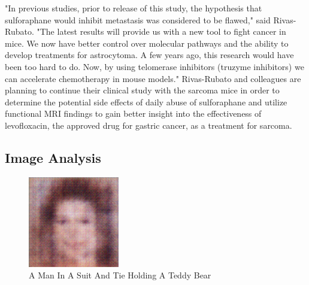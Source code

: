 \documentclass{article}%
\begin{document}
"In previous studies, prior to release of this study, the hypothesis that sulforaphane would inhibit metastasis was considered to be flawed," said Rivas{-}Rubato. "The latest results will provide us with a new tool to fight cancer in mice. We now have better control over molecular pathways and the ability to develop treatments for astrocytoma. A few years ago, this research would have been too hard to do. Now, by using telomerase inhibitors (truzyme inhibitors) we can accelerate chemotherapy in mouse models."\newline%
Rivas{-}Rubato and colleagues are planning to continue their clinical study with the sarcoma mice in order to determine the potential side effects of daily abuse of sulforaphane and utilize functional MRI findings to gain better insight into the effectiveness of levofloxacin, the approved drug for gastric cancer, as a treatment for sarcoma.

%
\subsection{Image Analysis}%
\label{subsec:ImageAnalysis}%


\begin{figure}[h!]%
\centering%
\includegraphics[width=150px]{500_fake_images/samples_5_383.png}%
\caption{A Man In A Suit And Tie Holding A Teddy Bear}%
\end{figure}

%
\end{document}
